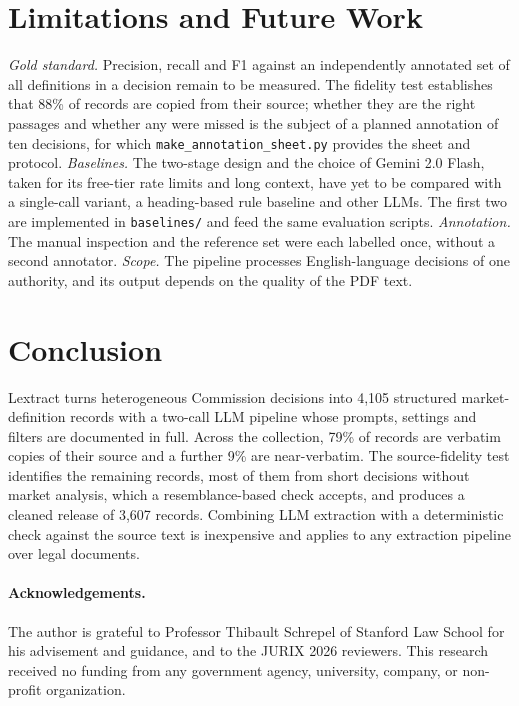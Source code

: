 \documentclass{IOS-Book-Article}
\begin{document}
\section{Limitations and Future Work}
\label{sec:limitations}

\emph{Gold standard.} Precision, recall and F1 against an independently
annotated set of all definitions in a decision remain to be measured. The
fidelity test establishes that 88\% of records are copied from their source;
whether they are the right passages and whether any were missed is the subject
of a planned annotation of ten decisions, for which
\texttt{make\_annotation\_sheet.py} provides the sheet and protocol.
\emph{Baselines.} The two-stage design and the choice of Gemini 2.0 Flash,
taken for its free-tier rate limits and long context, have yet to be compared
with a single-call variant, a heading-based rule baseline and other LLMs. The
first two are implemented in \texttt{baselines/} and feed the same evaluation
scripts. \emph{Annotation.} The manual inspection and the reference set were
each labelled once, without a second annotator. \emph{Scope.} The pipeline
processes English-language decisions of one authority, and its output depends
on the quality of the PDF text.

\section{Conclusion}
\label{sec:conclusion}

Lextract turns heterogeneous Commission decisions into 4,105 structured
market-definition records with a two-call LLM pipeline whose prompts, settings
and filters are documented in full. Across the collection, 79\% of records are
verbatim copies of their source and a further 9\% are near-verbatim. The
source-fidelity test identifies the remaining records, most of them from short
decisions without market analysis, which a resemblance-based check accepts, and
produces a cleaned release of 3,607 records. Combining LLM extraction with a
deterministic check against the source text is inexpensive and applies to any
extraction pipeline over legal documents.

\paragraph{Acknowledgements.}
The author is grateful to Professor Thibault Schrepel of Stanford Law School for
his advisement and guidance, and to the JURIX 2026 reviewers. This research
received no funding from any government agency, university, company, or
non-profit organization.



\end{document}
